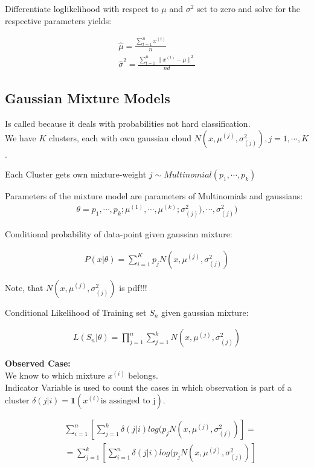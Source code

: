 Differentiate loglikelihood with respect to $\mu$ and $\sigma^2$ set to zero and solve for the respective parameters yields:

\begin{align*}
\hat{\mu } = \frac{\sum _{t=1}^{n} x^{(t)}}{n}\\
\hat{\sigma }^2 = \frac{\sum _{t=1}^ n \| x^{(t)} - \mu \| ^2}{nd}
\end{align*}


\subsection{Gaussian Mixture Models}
Is called  because it  deals with probabilities not hard classification.\\

We have $K$ clusters, each with own gaussian cloud $N(x, \mu^{(j)}, \sigma^2_{(j)}), j=1,\cdots,K$. 

Each Cluster gets own mixture-weight $j \sim Multinomial(p_1,\cdots,p_k)$ 

Parameters of the mixture model are parameters of Multinomials and gaussians: 
\begin{align*}
\theta={p_1,\cdots,p_k;\mu^{(1)},\cdots,\mu^{(k)};\sigma^2_{(j)}),\cdots,\sigma^2_{(j)})}
\end{align*}

Conditional probability of data-point given gaussian mixture:

\begin{align*}
P(x|\theta)=\sum_{i=1}^K p_j N(x,\mu^{(j)},\sigma^2_{(j)})
\end{align*}

Note, that $N(x,\mu^{(j)},\sigma^2_{(j)})$ is pdf!!!

Conditional Likelihood of Training set $S_n$ given gaussian mixture:

\begin{align*}
L(S_n|\theta)= \prod_{j=1}^{n} \sum_{j=1}^{k} N(x,\mu^{(j)},\sigma^2_{(j)})
\end{align*}

\textbf{Observed Case:}\\
We know to which mixture $x^(i)$ belongs.\\

Indicator Variable is used to count the cases in which observation is part of a cluster $\delta(j|i)=\textbf{1}(x^{(i)} \text{is assinged to j})$.


\begin{align*}
&\sum_{i=1}^n [\sum_{j=1}^k \delta(j|i) log (p_j N(x,\mu^{(j)},\sigma^2_{(j)})]=\\
&= \sum_{j=1}^k [\sum_{i=1}^n \delta(j|i) log (p_j N(x,\mu^{(j)},\sigma^2_{(j)})]\\
\end{align*}

